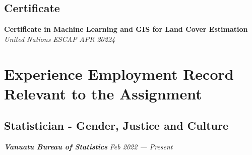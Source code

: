 \documentclass[
  letterpaper,
  DIV=11,
  numbers=noendperiod]{scrartcl}
\begin{document}
\subsection{Certificate}\label{certificate}

\textbf{Certificate in Machine Learning and GIS for Land Cover
Estimation}\\
\emph{United Nations ESCAP} {\emph{APR 20224}}\\

\section{Experience Employment Record Relevant to the
Assignment}\label{experience-employment-record-relevant-to-the-assignment}

\subsection{Statistician - Gender, Justice and
Culture}\label{statistician---gender-justice-and-culture}

\textbf{\emph{Vanuatu Bureau of Statistics}} {\emph{Feb 2022 ---
Present}}\\
\end{document}
